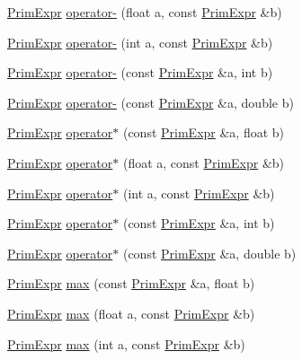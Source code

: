 \begin{DoxyCompactItemize}
\hyperlink{classtvm_1_1PrimExpr}{Prim\+Expr} \hyperlink{namespacetvm_aef861fe5325bc0b415a905a24c42f10a}{operator-\/} (float a, const \hyperlink{classtvm_1_1PrimExpr}{Prim\+Expr} \&b)
\item 
\hyperlink{classtvm_1_1PrimExpr}{Prim\+Expr} \hyperlink{namespacetvm_a4f40ad3340a853d58664bc864dc10d47}{operator-\/} (int a, const \hyperlink{classtvm_1_1PrimExpr}{Prim\+Expr} \&b)
\item 
\hyperlink{classtvm_1_1PrimExpr}{Prim\+Expr} \hyperlink{namespacetvm_af7c46ff33a2727f48b10d7d563f4a746}{operator-\/} (const \hyperlink{classtvm_1_1PrimExpr}{Prim\+Expr} \&a, int b)
\item 
\hyperlink{classtvm_1_1PrimExpr}{Prim\+Expr} \hyperlink{namespacetvm_a028ba217f99b6cb1592a6a56b2bc9ee5}{operator-\/} (const \hyperlink{classtvm_1_1PrimExpr}{Prim\+Expr} \&a, double b)
\item 
\hyperlink{classtvm_1_1PrimExpr}{Prim\+Expr} \hyperlink{namespacetvm_af70bb4a982810d795dbd17ce73c6b124}{operator$\ast$} (const \hyperlink{classtvm_1_1PrimExpr}{Prim\+Expr} \&a, float b)
\item 
\hyperlink{classtvm_1_1PrimExpr}{Prim\+Expr} \hyperlink{namespacetvm_ace5dbde3bde1ba48d14a3f9064a45aee}{operator$\ast$} (float a, const \hyperlink{classtvm_1_1PrimExpr}{Prim\+Expr} \&b)
\item 
\hyperlink{classtvm_1_1PrimExpr}{Prim\+Expr} \hyperlink{namespacetvm_aca621e1d2df8562819bc021c1410b741}{operator$\ast$} (int a, const \hyperlink{classtvm_1_1PrimExpr}{Prim\+Expr} \&b)
\item 
\hyperlink{classtvm_1_1PrimExpr}{Prim\+Expr} \hyperlink{namespacetvm_a6823188ec16be854223bbffe349c975d}{operator$\ast$} (const \hyperlink{classtvm_1_1PrimExpr}{Prim\+Expr} \&a, int b)
\item 
\hyperlink{classtvm_1_1PrimExpr}{Prim\+Expr} \hyperlink{namespacetvm_a1815d8b152819885a5733554f374a9ca}{operator$\ast$} (const \hyperlink{classtvm_1_1PrimExpr}{Prim\+Expr} \&a, double b)
\item 
\hyperlink{classtvm_1_1PrimExpr}{Prim\+Expr} \hyperlink{namespacetvm_a7134c7ce44fbedab5990f19428ceb5c4}{max} (const \hyperlink{classtvm_1_1PrimExpr}{Prim\+Expr} \&a, float b)
\item 
\hyperlink{classtvm_1_1PrimExpr}{Prim\+Expr} \hyperlink{namespacetvm_abc6aa5a903c9a71faece2f5dfbc8218c}{max} (float a, const \hyperlink{classtvm_1_1PrimExpr}{Prim\+Expr} \&b)
\item 
\hyperlink{classtvm_1_1PrimExpr}{Prim\+Expr} \hyperlink{namespacetvm_a7bd1dc5f6d10420562d216bb3660270d}{max} (int a, const \hyperlink{classtvm_1_1PrimExpr}{Prim\+Expr} \&b)

\end{DoxyCompactItemize}
